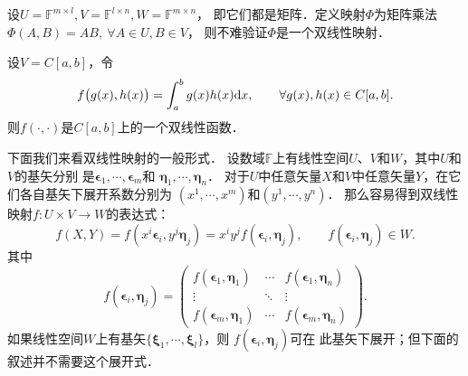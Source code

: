 \begin{example}
    设$U=\mathbb{F}^{m\times l}, V=\mathbb{F}^{l\times n}, W=\mathbb{F}^{m\times n}$，
    即它们都是矩阵．定义映射$\Phi$为矩阵乘法$\Phi(A,B)=AB, \ \forall A\in U, B\in V$，
    则不难验证$\Phi$是一个双线性映射．
\end{example}

\begin{example}
    设$V=C[a,b]$，令
    \begin{equation}
        f\bigl( g(x), h(x)\bigr) = \int_{a}^{b} g(x) h(x) {\rm d}x,
        \qquad \forall g(x), h(x)\in C[a,b].
    \end{equation}
    则$f(\cdot,\cdot)$是$C[a,b]$上的一个双线性函数．
\end{example}


下面我们来看双线性映射的一般形式．
    设数域$\mathbb{F}$上有线性空间$U$、$V$和$W$，其中$U$和$V$的基矢分别
    是$\boldsymbol{\epsilon}_1, \cdots, \boldsymbol{\epsilon}_m$和
    $\boldsymbol{\eta}_1, \cdots, \boldsymbol{\eta}_n$．
    对于$U$中任意矢量$X$和$V$中任意矢量$Y$，在它们各自基矢下展开系数分别为
    $(x^1,\cdots,x^m)$和$(y^1,\cdots,y^n)$．
    那么容易得到双线性映射$f:U\times V \to W$的表达式：
    \begin{equation}\label{chmla:eqn_fxy-expand}
        f(X,Y)  = f\left( x^i \boldsymbol{\epsilon}_i, y^j \boldsymbol{\eta}_j\right)
        = x^i y^j f\left( \boldsymbol{\epsilon}_i,  \boldsymbol{\eta}_j\right) ,
        \qquad f\left( \boldsymbol{\epsilon}_i,  \boldsymbol{\eta}_j\right)  \in W.
    \end{equation}
    其中
    \begin{equation}\label{chmla:eqn_metricij}
        f\left( \boldsymbol{\epsilon}_i,  \boldsymbol{\eta}_j\right) =
        \begin{pmatrix}
            f\left( \boldsymbol{\epsilon}_1,  \boldsymbol{\eta}_1\right)  &  \cdots &
            f\left( \boldsymbol{\epsilon}_1,  \boldsymbol{\eta}_n\right)  \\
            \vdots & \ddots & \vdots \\
            f\left( \boldsymbol{\epsilon}_m,  \boldsymbol{\eta}_1\right)  & \cdots &
            f\left( \boldsymbol{\epsilon}_m,  \boldsymbol{\eta}_n\right)
        \end{pmatrix}.
    \end{equation}
如果线性空间$W$上有基矢$\{\boldsymbol{\xi}_1,\cdots,\boldsymbol{\xi}_l \}$，则
$f\left( \boldsymbol{\epsilon}_i,  \boldsymbol{\eta}_j\right) $可在
此基矢下展开；但下面的叙述并不需要这个展开式．

